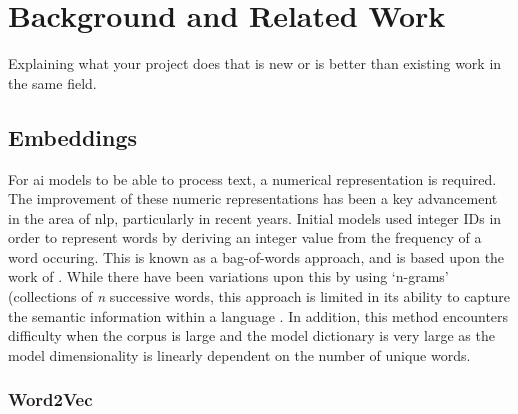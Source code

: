 \chapter{Background and Related Work}

\label{ch:background} 
\label{sec:background}


Explaining what your project does that is new or is better than existing work in the same field.

\section{Embeddings}
\label{sec:embeddings}

For \acrshort{ai} models to be able to process text, a numerical representation is required. The improvement of these numeric representations has been a key advancement in the area of \acrfull{nlp}, particularly in recent years. Initial models used integer IDs in order to represent words by deriving an integer value from the frequency of a word occuring. This is known as a bag-of-words approach, and is based upon the work of \citet{Zellig}. While there have been variations upon this by using `n-grams' (collections of \textit{n} successive words, this approach is limited in its ability to capture the semantic information within a language \citep{Monisha}. In addition, this method encounters difficulty when the corpus is large and the model dictionary is very large as the model dimensionality is linearly dependent on the number of unique words. 

\subsection{Word2Vec}
\label{sec:embeddings_word2vec}

